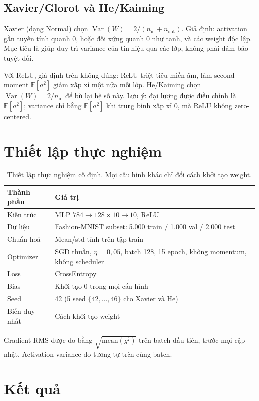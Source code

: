 \documentclass[12pt,a4paper]{article}
\begin{document}
\subsection{Xavier/Glorot và He/Kaiming}
Xavier (dạng Normal) chọn $\operatorname{Var}(W)=2/(n_{\text{in}}+n_{\text{out}})$. Giả định: activation gần tuyến tính quanh 0, hoặc đối xứng quanh 0 như tanh, và các weight độc lập. Mục tiêu là giúp duy trì variance của tín hiệu qua các lớp, không phải đảm bảo tuyệt đối.

Với ReLU, giả định trên không đúng: ReLU triệt tiêu miền âm, làm second moment $\mathbb E[a^2]$ giảm xấp xỉ một nửa mỗi lớp. He/Kaiming chọn $\operatorname{Var}(W)=2/n_{\text{in}}$ để bù lại hệ số này. Lưu ý: đại lượng được điều chỉnh là $\mathbb E[a^2]$; variance chỉ bằng $\mathbb E[a^2]$ khi trung bình xấp xỉ 0, mà ReLU không zero-centered.

\section{Thiết lập thực nghiệm}
\begin{table}[H]
\centering
\begin{tabular}{ll}
\toprule
Thành phần & Giá trị \\
\midrule
Kiến trúc & MLP $784\to128\times 10\to 10$, ReLU \\
Dữ liệu & Fashion-MNIST subset: 5.000 train / 1.000 val / 2.000 test \\
Chuẩn hoá & Mean/std tính trên tập train \\
Optimizer & SGD thuần, $\eta=0{,}05$, batch 128, 15 epoch, không momentum, không scheduler \\
Loss & CrossEntropy \\
Bias & Khởi tạo 0 trong mọi cấu hình \\
Seed & 42 (5 seed $\{42,\dots,46\}$ cho Xavier và He) \\
Biến duy nhất & Cách khởi tạo weight \\
\bottomrule
\end{tabular}
\caption{Thiết lập thực nghiệm cố định. Mọi cấu hình khác chỉ đổi cách khởi tạo weight.}
\end{table}

Gradient RMS được đo bằng $\sqrt{\mathrm{mean}(g^2)}$ trên batch đầu tiên, trước mọi cập nhật. Activation variance đo tương tự trên cùng batch.

\section{Kết quả}
\end{document}
